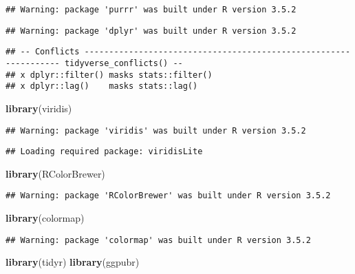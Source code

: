 \documentclass[]{article}
\newenvironment{Shaded}{\begin{snugshade}}{\end{snugshade}}
\newcommand{\KeywordTok}[1]{\textcolor[rgb]{0.13,0.29,0.53}{\textbf{#1}}}
\newcommand{\NormalTok}[1]{#1}
\begin{document}
\begin{verbatim}
## Warning: package 'purrr' was built under R version 3.5.2
\end{verbatim}

\begin{verbatim}
## Warning: package 'dplyr' was built under R version 3.5.2
\end{verbatim}

\begin{verbatim}
## -- Conflicts ----------------------------------------------------------------- tidyverse_conflicts() --
## x dplyr::filter() masks stats::filter()
## x dplyr::lag()    masks stats::lag()
\end{verbatim}

\begin{Shaded}
\begin{Highlighting}[]
\KeywordTok{library}\NormalTok{(viridis)}
\end{Highlighting}
\end{Shaded}

\begin{verbatim}
## Warning: package 'viridis' was built under R version 3.5.2
\end{verbatim}

\begin{verbatim}
## Loading required package: viridisLite
\end{verbatim}

\begin{Shaded}
\begin{Highlighting}[]
\KeywordTok{library}\NormalTok{(RColorBrewer)}
\end{Highlighting}
\end{Shaded}

\begin{verbatim}
## Warning: package 'RColorBrewer' was built under R version 3.5.2
\end{verbatim}

\begin{Shaded}
\begin{Highlighting}[]
\KeywordTok{library}\NormalTok{(colormap)}
\end{Highlighting}
\end{Shaded}

\begin{verbatim}
## Warning: package 'colormap' was built under R version 3.5.2
\end{verbatim}

\begin{Shaded}
\begin{Highlighting}[]
\KeywordTok{library}\NormalTok{(tidyr)}
\KeywordTok{library}\NormalTok{(ggpubr)}
\end{Highlighting}
\end{Shaded}
\end{document}
